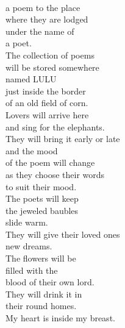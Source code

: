 \documentclass[smalldemyvopaper,11pt,twoside,onecolumn,openright,extrafontsizes]{memoir}
\begin{document}
\\a poem to the place
\\where they are lodged
\\under the name of
\\a poet.
\\The collection of poems
\\will be stored somewhere
\\named LULU
\\just inside the border
\\of an old field of corn.
\\Lovers will arrive here
\\and sing for the elephants.
\\They will bring it early or late
\\and the mood
\\of the poem will change
\\as they choose their words
\\to suit their mood.
\\The poets will keep
\\the jeweled baubles
\\slide warm.
\\They will give their loved ones
\\new dreams.
\\The flowers will be
\\filled with the
\\blood of their own lord.
\\They will drink it in
\\their round homes.
\\My heart is inside my breast.
\end{document}
